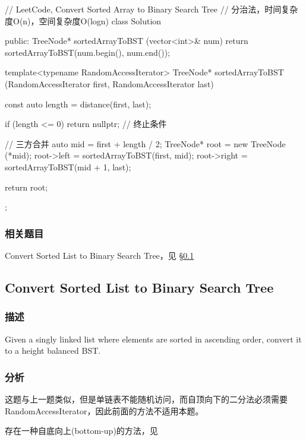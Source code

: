 \begin{Code}
// LeetCode, Convert Sorted Array to Binary Search Tree
// 分治法，时间复杂度O(n)，空间复杂度O(logn)
class Solution {
public:
    TreeNode* sortedArrayToBST (vector<int>& num) {
        return sortedArrayToBST(num.begin(), num.end());
    }

    template<typename RandomAccessIterator>
    TreeNode* sortedArrayToBST (RandomAccessIterator first,
            RandomAccessIterator last) {
        const auto length = distance(first, last);

        if (length <= 0) return nullptr;  // 终止条件

        // 三方合并
        auto mid = first + length / 2;
        TreeNode* root = new TreeNode (*mid);
        root->left = sortedArrayToBST(first, mid);
        root->right = sortedArrayToBST(mid + 1, last);

        return root;
    }
};
\end{Code}


\subsubsection{相关题目}
\begindot
\item Convert Sorted List to Binary Search Tree，见 \S \ref{sec:convert-sorted-list-to-binary-search-tree}
\myenddot


\subsection{Convert Sorted List to Binary Search Tree}
\label{sec:convert-sorted-list-to-binary-search-tree}


\subsubsection{描述}
Given a singly linked list where elements are sorted in ascending order, convert it to a height balanced BST.


\subsubsection{分析}
这题与上一题类似，但是单链表不能随机访问，而自顶向下的二分法必须需要RandomAccessIterator，因此前面的方法不适用本题。

存在一种自底向上(bottom-up)的方法，见


